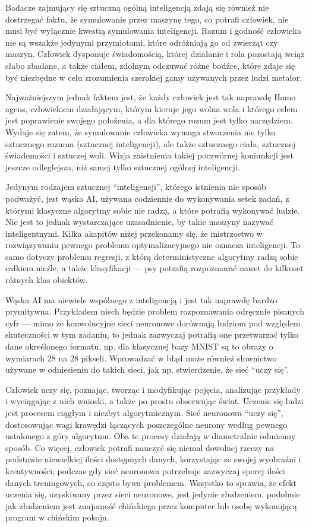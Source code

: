 \documentclass[10pt,a4paper]{article}
\begin{document}
	\par Badacze zajmujący się sztuczną ogólną inteligencją zdają się również nie dostrzegać faktu, że symulowanie przez maszynę tego, co potrafi człowiek, nie musi być wyłącznie kwestią symulowania inteligencji. Rozum i godność człowieka nie są wszakże jedynymi przymiotami, które odróżniają go od zwierząt czy maszyn. Człowiek dysponuje świadomością, której działanie i rola pozostają wciąż słabo zbadane, a także ciałem, zdolnym odczuwać różne bodźce, które zdaje się być niezbędne w celu zrozumienia szerokiej gamy używanych przez ludzi metafor.
	\par Najważniejszym jednak faktem jest, że każdy człowiek jest tak naprawdę Homo agens, człowiekiem działającym, którym kieruje jego wolna wola i którego celem jest poprawienie swojego położenia, a dla którego rozum jest tylko narzędziem. Wydaje się zatem, że symulowanie człowieka wymaga stworzenia nie tylko sztucznego rozumu (sztucznej inteligencji), ale także sztucznego ciała, sztucznej świadomości i sztuczej woli. Wizja zaistnienia takiej poczwórnej koniunkcji jest jeszcze odleglejsza, niż samej tylko sztucznej ogólnej inteligencji.
	\par Jedynym rodzajem sztucznej ``inteligencji'', którego istnienia nie sposób podważyć, jest wąska AI, używana codziennie do wykonywania setek zadań, z którymi klasyczne algorytmy sobie nie radzą, a które potrafią wykonywać ludzie. Nie jest to jednak wystarczające uzasadnienie, by takie maszyny nazywać inteligentnymi. Kilka akapitów niżej przekonamy się, że mistrzostwo w rozwiązywaniu pewnego problemu optymalizacyjnego nie oznacza inteligencji. To samo dotyczy problemu regresji, z którą deterministyczne algorytmy radzą sobie całkiem nieźle, a także klasyfikacji — psy potrafią rozpoznawać nawet do kilkuset różnych klas obiektów.
	\par Wąska AI ma niewiele wspólnego z inteligencją i jest tak naprawdę bardzo prymitywna. Przykładem niech będzie problem rozpoznawania odręcznie pisanych cyfr — mimo że konwolucyjne sieci neuronowe dorównują ludziom pod względem skuteczności w tym zadaniu, to jednak zazwyczaj potrafią one przetwarzać tylko dane określonego formatu, np. dla klasycznej bazy MNIST są to obrazy o wymiarach 28 na 28 pikseli. Wprowadzać w błąd może również słownictwo używane w odniesieniu do takich sieci, jak np. stwierdzenie, że sieć ``uczy się''.
	\par Człowiek uczy się, poznając, tworząc i modyfikując pojęcia, analizując przykłady i wyciągając z nich wnioski, a także po prostu obserwując świat. Uczenie się ludzi jest procesem ciągłym i niezbyt algorytmicznym. Sieć neuronowa ``uczy się'', dostosowując wagi krawędzi łączących poszczególne neurony według pewnego ustalonego z góry algorytmu. Oba te procesy działają w diametralnie odmienny sposób. Co więcej, człowiek potrafi nauczyć się niemal dowolnej rzeczy na podstawie niewielkiej ilości dostępnych danych, korzystając ze swojej wyobraźni i kreatywności, podczas gdy sieć neuronowa potrzebuje zazwyczaj sporej ilości danych treningowych, co często bywa problemem. Wszystko to sprawia, że efekt uczenia się, uzyskiwany przez sieci neuronowe, jest jedynie złudzeniem, podobnie jak złudzeniem jest znajomość chińskiego przez komputer lub osobę wykonującą program w chińskim pokoju.
\end{document}
